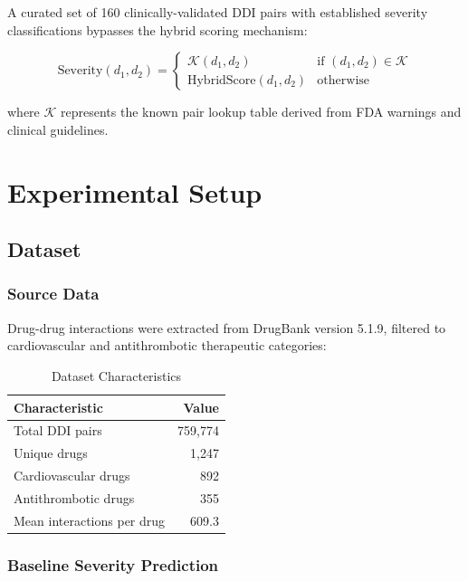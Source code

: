 \documentclass[11pt,a4paper]{article}
\begin{document}
A curated set of 160 clinically-validated DDI pairs with established severity classifications bypasses the hybrid scoring mechanism:

\begin{equation}
\text{Severity}(d_1, d_2) = 
\begin{cases}
\mathcal{K}(d_1, d_2) & \text{if } (d_1, d_2) \in \mathcal{K} \\
\text{HybridScore}(d_1, d_2) & \text{otherwise}
\end{cases}
\end{equation}

where $\mathcal{K}$ represents the known pair lookup table derived from FDA warnings and clinical guidelines.

\section{Experimental Setup}

\subsection{Dataset}

\subsubsection{Source Data}
Drug-drug interactions were extracted from DrugBank version 5.1.9, filtered to cardiovascular and antithrombotic therapeutic categories:

\begin{table}[H]
\centering
\caption{Dataset Characteristics}
\label{tab:dataset}
\begin{tabular}{@{}lr@{}}
\toprule
\textbf{Characteristic} & \textbf{Value} \\
\midrule
Total DDI pairs & 759,774 \\
Unique drugs & 1,247 \\
Cardiovascular drugs & 892 \\
Antithrombotic drugs & 355 \\
Mean interactions per drug & 609.3 \\
\bottomrule
\end{tabular}
\end{table}

\subsubsection{Baseline Severity Prediction}
\end{document}
